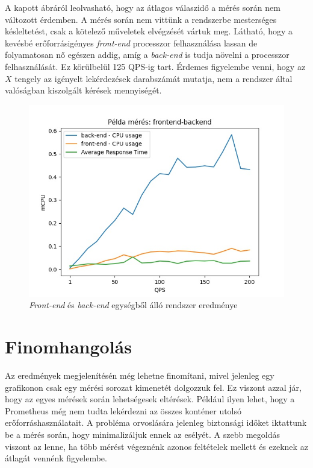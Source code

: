 A kapott ábráról leolvasható, hogy az átlagos válaszidő a mérés során nem változott érdemben. A mérés során nem vittünk a rendszerbe mesterséges késleltetést, csak a kötelező műveletek elvégzését vártuk meg. Látható, hogy a kevésbé erőforrásigényes \textit{front-end} processzor felhasználása lassan de folyamatosan nő egészen addig, amíg a \textit{back-end} is tudja növelni a processzor felhasználását. Ez körülbelül 125 QPS-ig tart. Érdemes figyelembe venni, hogy az $X$ tengely az igényelt lekérdezések darabszámát mutatja, nem a rendszer által valóságban kiszolgált kérések mennyiségét. \\


\begin{figure}[!ht]
\centering
\includegraphics[width=150mm, keepaspectratio]{figures/example_plot.jpg}
\caption{\textit{Front-end} és \textit{back-end} egységből álló rendszer eredménye}
\label{fig:example_plot}
\end{figure}


\section{Finomhangolás}
Az eredmények megjelenítésén még lehetne finomítani, mivel jelenleg egy grafikonon csak egy mérési sorozat kimenetét dolgozzuk fel. Ez viszont azzal jár, hogy az egyes mérések során lehetségesek eltérések. Például ilyen lehet, hogy a Prometheus még nem tudta lekérdezni az összes konténer utolsó erőforráshasználatait. A probléma orvoslására jelenleg biztonsági időket iktattunk be a mérés során, hogy minimalizáljuk ennek az esélyét. A szebb megoldás viszont az lenne, ha több mérést végeznénk azonos feltételek mellett és ezeknek az átlagát vennénk figyelembe.

